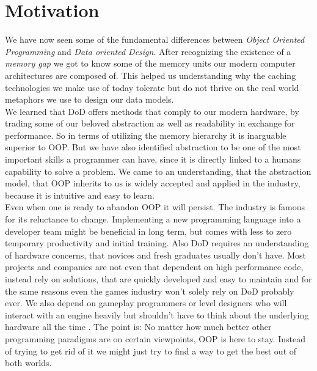 \chapter{Motivation}
We have now seen some of the fundamental differences between \textit{Object Oriented Programming} and \textit{Data oriented Design}. After recognizing the existence of a \textit{memory gap} we got to know some of the memory units our modern computer architectures are composed of. This helped us understanding why the caching technologies we make use of today tolerate but do not thrive on the real world metaphors we use to design our data models.\\
We learned that DoD offers methods that comply to our modern hardware, by trading some of our beloved abstraction as well as readability in exchange for performance. So in terms of utilizing the memory hierarchy it is inarguable superior to OOP. But we have also identified abstraction to be one of the most important skills a programmer can have, since it is directly linked to a humans capability to solve a problem. We came to an understanding, that the abstraction model, that OOP inherits to us is widely accepted and applied in the industry, because it is intuitive and easy to learn.\\
Even when one is ready to abandon OOP it will persist. The industry is famous for its reluctance to change. Implementing a new programming language into a developer team might be beneficial in long term, but comes with less to zero temporary productivity and initial training. Also DoD requires an understanding of hardware concerns, that novices and fresh graduates usually don't have. Most projects and companies are not even that dependent on high performance code, instead rely on solutions, that are quickly developed and easy to maintain and for the same reasons even the games industry won't solely rely on DoD probably ever. We also depend on gameplay programmers or level designers who will interact with an engine heavily but shouldn't have to think about the underlying hardware all the time . The point is: No matter how much better other programming paradigms are on certain viewpoints, OOP is here to stay. Instead of trying to get rid of it we might just try to find a way to get the best out of both worlds.

